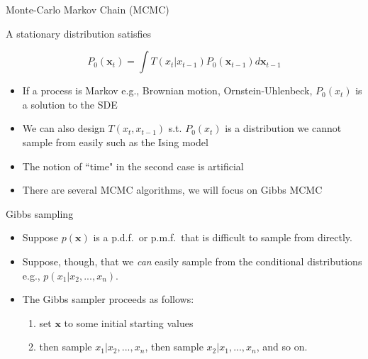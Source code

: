 \documentclass{beamer}					%
\begin{document}
\begin{frame}{Monte-Carlo Markov Chain (MCMC)}

A stationary distribution satisfies

\begin{equation*}
P_{0}(\mathbf{x}_t) = \int T(x_{t}|x_{t-1})P_{0}(\mathbf{x}_{t-1})d\mathbf{x}_{t-1}
\end{equation*} 

\begin{itemize}
\item If a process is Markov e.g., Brownian motion, Ornstein-Uhlenbeck, $P_{0}(x_{t})$ is a solution to the SDE 
\item We can also design $T(x_{t},x_{t-1})$ s.t. $P_{0}(x_{t})$ is a distribution we cannot sample from easily such as the Ising model
\item The notion of ``time" in the second case is artificial
\item There are several MCMC algorithms, we will focus on Gibbs MCMC
\end{itemize}

\end{frame}

\begin{frame}{Gibbs sampling}

\begin{itemize}
\item Suppose $p(\mathbf{x})$ is a p.d.f.\ or p.m.f.\ that is difficult to sample from directly.  
\item Suppose, though, that we \textit{can} easily sample from the conditional distributions e.g., $p(x_{1}|x_{2},...,x_{n})$. 
\item  The Gibbs sampler proceeds as follows: 
\begin{enumerate}
\item set $\mathbf{x}$ to some initial starting values
\item then sample $x_{1}|x_{2},...,x_{n}$, then sample $x_{2}|x_{1},...,x_{n}$, and so on.
\end{enumerate}
\end{itemize}
\end{frame}
\end{document}
